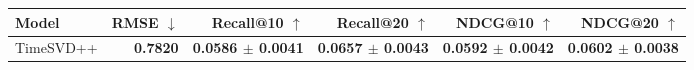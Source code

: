 \begin{tabular}{lrrrrr}
\toprule
Model & RMSE $\downarrow$ & Recall@10 $\uparrow$ & Recall@20 $\uparrow$ & NDCG@10 $\uparrow$ & NDCG@20 $\uparrow$ \\
\midrule
TimeSVD++ & \textbf{0.7820} & \textbf{0.0586 $\pm$ 0.0041} & \textbf{0.0657 $\pm$ 0.0043} & \textbf{0.0592 $\pm$ 0.0042} & \textbf{0.0602 $\pm$ 0.0038} \\
\bottomrule
\end{tabular}
